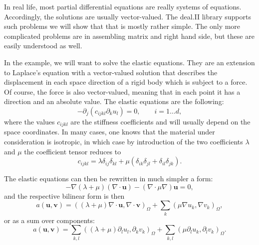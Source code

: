 \documentclass{article}
\renewcommand{\vec}[1]{{\mathbf #1}}
\renewcommand{\div}{\nabla \cdot}
\begin{document}
In real life, most partial differential equations are really systems
of equations. Accordingly, the solutions are usually
vector-valued. The deal.II library supports such problems we will show
that that is mostly rather simple. The only more complicated problems
are in assembling matrix and right hand side, but these are easily
understood as well. 

In the example, we will want to solve the elastic equations. They are
an extension to Laplace's equation with a vector-valued solution that
describes the displacement in each space direction of a rigid body
which is subject to a force. Of course, the force is also
vector-valued, meaning that in each point it has a direction and an
absolute value. The elastic equations are the following:
$$
  -
  \partial_j (c_{ijkl} \partial_k u_l)
  =
  0,
  \qquad
  i=1\ldots d,
$$
where the values $c_{ijkl}$ are the stiffness coefficients and
will usually depend on the space coordinates. In
many cases, one knows that the material under consideration is
isotropic, in which case by introduction of the two coefficients
$\lambda$ and $\mu$ the coefficient tensor reduces to
$$
  c_{ijkl} 
  =
  \lambda \delta_{ij} \delta_{kl} + 
  \mu (\delta_{ik} \delta_{jl} + \delta_{il} \delta_{jk}).
$$

The elastic equations can then be rewritten in much simpler a form:
$$
   -
   \nabla (\lambda+\mu) (\div \vec u)
   -
   (\nabla \cdot \mu \nabla) \vec u
   =
   0,
$$
and the respective bilinear form is then
$$
  a(\vec u, \vec v) =
  \left(
    (\lambda+\mu) \div \vec u, \div \vec v
  \right)_\Omega
  +
  \sum_k
  \left(
    \mu \nabla u_k, \nabla v_k
  \right)_\Omega,
$$
or as a sum over components:
$$
  a(\vec u, \vec v) =
  \sum_{k,l}
  \left(
    (\lambda+\mu) \partial_l u_l, \partial_k v_k
  \right)_\Omega
  +
  \sum_{k,l}
  \left(
    \mu \partial_l u_k, \partial_l v_k
  \right)_\Omega.
$$
\end{document}
